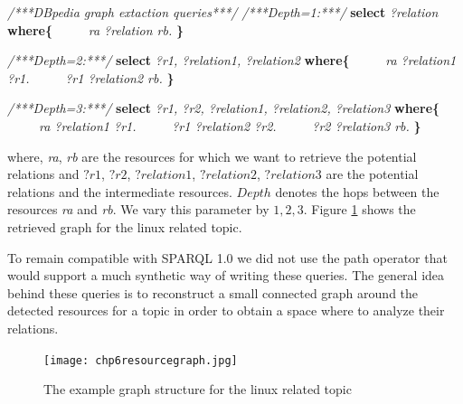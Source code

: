 \begin{algorithm}%
\begin{algorithmic}[1]
\label{algo:dbpediaquery}
\State \textit{/***DBpedia graph extaction queries***/}
\State \textit{/***Depth=1:***/}
\State \textbf{select} \textit{?relation}
\State \textbf{where\{}
\State \ \ \ \ \ \textit{ra ?relation rb.}
\State \textbf{\}}

\State \textit{/***Depth=2:***/}
\State \textbf{select}  \textit{?r1, ?relation1, ?relation2} 
\State \textbf{where\{} 
\State \ \ \ \ \ \textit{ra ?relation1 ?r1.}
\State \ \ \ \ \ \textit{?r1 ?relation2 rb.} 
\State \textbf{\}} 

\State \textit{/***Depth=3:***/}
\State \textbf{select}  \textit{?r1, ?r2, ?relation1, ?relation2, ?relation3} 
\State \textbf{where\{} 
\State \ \ \ \ \ \textit{ra ?relation1 ?r1.}
\State \ \ \ \ \ \textit{?r1 ?relation2 ?r2.}
\State \ \ \ \ \ \textit{?r2 ?relation3 rb.} 
\State \textbf{\}} 
\end{algorithmic}
\end{algorithm}

where, \textit{ra}, \textit{rb} are the resources for which we want to retrieve the potential relations and $?r1$, $?r2$, $?relation1$, $?relation2$, $?relation3$ are the potential relations and the intermediate resources. $Depth$ denotes the hops between the resources \textit{ra} and \textit{rb}. We vary this parameter by $1,2,3$. Figure \ref{fig:chp6resourcegraph} shows the retrieved graph for the linux related topic.

To remain compatible with SPARQL 1.0 we did not use the path operator that would support a much synthetic way of writing these queries. The general idea behind these queries is to reconstruct a small connected graph around the detected resources for a topic in order to obtain a space where to analyze their relations.

\begin{figure}[htp]
\centering
\texttt{[image: chp6resourcegraph.jpg]}  
\caption{The example graph structure for the linux related topic}
\label{fig:chp6resourcegraph} 
\end{figure}

